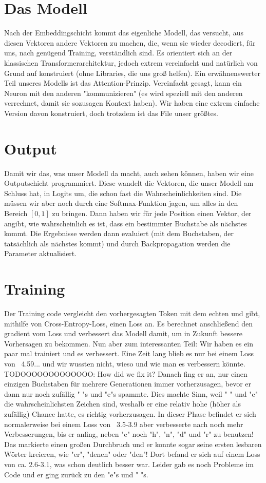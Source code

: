\documentclass[12pt, letterpaper]{article}
\begin{document}
\section{Das Modell}
Nach der Embeddingschicht kommt das eigenliche Modell, das versucht, aus diesen Vektoren andere Vektoren zu machen, die, wenn sie wieder decodiert, für uns, nach genügend Training, verständlich sind. Es orientiert sich an der klassischen Transformerarchitektur, jedoch extrem vereinfacht und natürlich von Grund auf konstruiert (ohne Libraries, die uns groß helfen). Ein erwähnenswerter Teil unseres Modells ist das Attention-Prinzip. Vereinfacht gesagt, kann ein Neuron mit den anderen "kommunizieren" (es wird speziell mit den anderen verrechnet, damit sie sozusagen Kontext haben). Wir haben eine extrem einfache Version davon konstruiert, doch trotzdem ist das File unser größtes. 
\section{Output}
Damit wir das, was unser Modell da macht, auch sehen können, haben wir eine Outputschicht programmiert. Diese wandelt die Vektoren, die unser Modell am Schluss hat, in Logits um, die schon fast die Wahrscheinlichkeiten sind. Die müssen wir aber noch durch eine Softmax-Funktion jagen, um alles in den Bereich $[0, 1]$ zu bringen. Dann haben wir für jede Position einen Vektor, der angibt, wie wahrscheinlich es ist, dass ein bestimmter Buchstabe als nächstes kommt. Die Ergebnisse werden dann evaluiert (mit dem Buchstaben, der tatsächlich als nächstes kommt) und durch Backpropagation werden die Parameter aktualisiert. 

\section{Training}
Der Training code vergleicht den vorhergesagten Token mit dem echten und gibt, mithilfe von Cross-Entropy-Loss, einen Loss an. Es berechnet anschließend den gradient vom Loss und verbessert das Modell damit, um in Zukunft bessere Vorhersagen zu bekommen. Nun aber zum interessanten Teil: Wir haben es ein paar mal trainiert und es verbessert. Eine Zeit lang blieb es nur bei einem Loss von ~4.59... und wir wussten nicht, wieso und wie man es verbessern könnte. TODOOOOOOOOOOOOO: How did we fix it? Danach fing er an, nur einen einzigen Buchstaben für mehrere Generationen immer vorherzusagen, bevor er dann nur noch zufällig " "s und "e"s spammte. Dies machte Sinn, weil " " und "e" die wahrscheinlichsten Zeichen sind, weshalb er eine relativ hohe (höher als zufällig) Chance hatte, es richtig vorherzusagen. In dieser Phase befindet er sich normalerweise bei einem Loss von ~3.5-3.9 aber verbesserte nach noch mehr Verbesserungen, bis er anfing, neben "e" noch "h", "n", "d" und "r" zu benutzen! Das markierte einen großen Durchbruch und er konnte sogar seine ersten lesbaren Wörter kreieren, wie "er", "denen" oder "den"! Dort befand er sich auf einem Loss von ca. 2.6-3.1, was schon deutlich besser war. Leider gab es noch Probleme im Code und er ging zurück zu den "e"s und " "s. 
\end{document}
